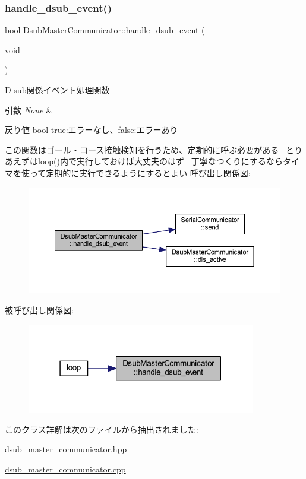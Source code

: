 \subsubsection{\texorpdfstring{handle\_dsub\_event()}{handle\_dsub\_event()}}
{\footnotesize\ttfamily bool Dsub\+Master\+Communicator\+::handle\+\_\+dsub\+\_\+event (\begin{DoxyParamCaption}\item[{void}]{ }\end{DoxyParamCaption})}



D-\/sub関係イベント処理関数 


\begin{DoxyParams}{引数}
{\em None} & \\
\hline
\end{DoxyParams}
\begin{DoxyReturn}{戻り値}
bool true\+:エラーなし、false\+:エラーあり
\end{DoxyReturn}
この関数はゴール・コース接触検知を行うため、定期的に呼ぶ必要がある~\newline
とりあえずはloop()内で実行しておけば大丈夫のはず~\newline
丁寧なつくりにするならタイマを使って定期的に実行できるようにするとよい 呼び出し関係図\+:
\nopagebreak
\begin{figure}[H]
\begin{center}
\leavevmode
\includegraphics[width=350pt]{class_dsub_master_communicator_a91a5a356d0aa58a30f3381522cd7616f_cgraph}
\end{center}
\end{figure}
被呼び出し関係図\+:
\nopagebreak
\begin{figure}[H]
\begin{center}
\leavevmode
\includegraphics[width=283pt]{class_dsub_master_communicator_a91a5a356d0aa58a30f3381522cd7616f_icgraph}
\end{center}
\end{figure}


このクラス詳解は次のファイルから抽出されました\+:\begin{DoxyCompactItemize}
\item 
\mbox{\hyperlink{dsub__master__communicator_8hpp}{dsub\+\_\+master\+\_\+communicator.\+hpp}}\item 
\mbox{\hyperlink{dsub__master__communicator_8cpp}{dsub\+\_\+master\+\_\+communicator.\+cpp}}\end{DoxyCompactItemize}
